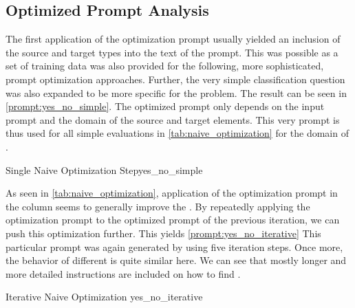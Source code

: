 \subsection{Optimized Prompt Analysis}
\label{subsec:Evaluation:naive_optimization:optimized-prompt-analysis}
The first application of the optimization prompt usually yielded an inclusion of the source and target types into the text of the prompt.
This was possible as a set of training data was also provided for the following, more sophisticated, prompt optimization approaches.
Further, the very simple classification question  was also expanded to be more specific for the \TLR problem.
The result can be seen in \autoref{prompt:yes_no_simple}.
The optimized prompt only depends on the input prompt and the domain of the source and target elements.
This very prompt is thus used for all simple \gpt evaluations in \autoref{tab:naive_optimization} for the domain of \RtR.

\begin{prompt}{\KISS Single Naive Optimization Step}{yes_no_simple}
    \\
    
\end{prompt}

As seen in \autoref{tab:naive_optimization}, application of the optimization prompt in the column  seems to generally improve the \fone.
By repeatedly applying the optimization prompt to the optimized prompt of the previous iteration, we can push this optimization further.
This yields \autoref{prompt:yes_no_iterative}
This particular prompt was again generated by \gpt using five iteration steps.
Once more, the behavior of different \LLMs is quite similar here.
We can see that mostly longer and more detailed instructions are included on how to find \TLs.

\begin{prompt}{\KISS Iterative Naive Optimization \gpt}{yes_no_iterative}
    \\
    
\end{prompt}

